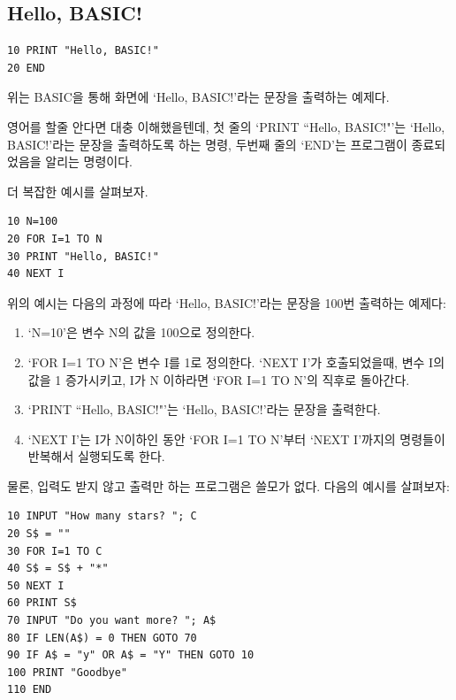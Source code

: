 \documentclass{article}
\begin{document}
\subsection{Hello, BASIC!}

\begin{lstlisting}
10 PRINT "Hello, BASIC!"
20 END
\end{lstlisting}

위는 BASIC을 통해 화면에 `Hello, BASIC!'라는 문장을 출력하는 예제다.

영어를 할줄 안다면 대충 이해했을텐데, 
첫 줄의 `PRINT ``Hello, BASIC!"'는 `Hello, BASIC!'라는 문장을 출력하도록 하는 명령,
두번째 줄의 `END'는 프로그램이 종료되었음을 알리는 명령이다.

더 복잡한 예시를 살펴보자.

\begin{lstlisting}
10 N=100
20 FOR I=1 TO N
30 PRINT "Hello, BASIC!"
40 NEXT I
\end{lstlisting}

위의 예시는 다음의 과정에 따라 `Hello, BASIC!'라는 문장을 100번 출력하는 예제다:

\begin{enumerate}
    \item `N=10'은 변수 N의 값을 100으로 정의한다.
    \item `FOR I=1 TO N'은 변수 I를 1로 정의한다.
    `NEXT I'가 호출되었을때, 변수 I의 값을 1 증가시키고,
    I가 N 이하라면 `FOR I=1 TO N'의 직후로 돌아간다.
    \item `PRINT ``Hello, BASIC!"'는 `Hello, BASIC!'라는 문장을 출력한다.
    \item `NEXT I'는 I가 N이하인 동안 `FOR I=1 TO N'부터 `NEXT I'까지의 명령들이 반복해서 실행되도록 한다.
\end{enumerate}

물론, 입력도 받지 않고 출력만 하는 프로그램은 쓸모가 없다.
다음의 예시를 살펴보자:

\begin{lstlisting}
10 INPUT "How many stars? "; C
20 S$ = ""
30 FOR I=1 TO C
40 S$ = S$ + "*"
50 NEXT I
60 PRINT S$
70 INPUT "Do you want more? "; A$
80 IF LEN(A$) = 0 THEN GOTO 70
90 IF A$ = "y" OR A$ = "Y" THEN GOTO 10
100 PRINT "Goodbye"
110 END
\end{lstlisting}
\end{document}

